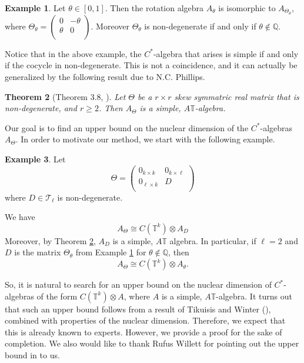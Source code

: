 \documentclass{amsart}
\newtheorem{theorem}{Theorem}[section]
\theoremstyle{definition}
\newtheorem{example}[theorem]{Example}
\newcommand{\Q}{\mathbb{Q}}
\newcommand{\TT}{\mathbb{T}}
\begin{document}
\begin{example}\label{rotation algebras skew symmetric matrix}
    Let $\theta\in [0,1]$. Then the rotation algebra $A_{\theta}$ is isomorphic to $A_{\Theta_{\theta}}$, where $\Theta_{\theta}=\begin{pmatrix}0&-\theta\\\theta&0\\ \end{pmatrix}$. Moreover $\Theta_{\theta}$ is non-degenerate if and only if $\theta \notin \Q$. 
\end{example}
Notice that in the above example, the $C^*$-algebra that arises is simple if and only if the cocycle in non-degenerate. This is not a coincidence, and it can actually be generalized by the following result due to N.C. Phillips.
\begin{theorem}[Theorem 3.8, \cite{simple_nc_torus}]\label{when nc torus is simple?}
 Let $\Theta$ be a $r\times r$ skew symmatric real matrix that is non-degenerate, and $r\geq 2$. Then $A_{\Theta}$ is a simple, $A\TT$-algebra.
\end{theorem}
Our goal is to find an upper bound on the nuclear dimension of the $C^*$-algebras $A_{\Theta}$. In order to motivate our method, we start with the following example.
\begin{example}\label{nc torus block digonal}
 Let $$\Theta=\begin{pmatrix}
     0_{k\times k}&0_{k\times \ell}\\ 0_{\ell \times k}& D\\
 \end{pmatrix}$$ where $D\in \mathcal{T}_{\ell}$ is non-degenerate. \par
We have
 $$A_{\Theta}\cong C(\TT^k)\otimes A_{D}$$
 Moreover, by Theorem \ref{when nc torus is simple?}, $A_D$ is a simple, $A\TT$ algebra.
 In particular, if $\ell=2$ and $D$ is the matrix $\Theta_{\theta}$ from Example \ref{rotation algebras skew symmetric matrix} for $\theta \notin \Q$, then
 $$A_{\Theta}\cong C(\TT^k)\otimes A_{\theta}.$$
\end{example}
So, it is natural to search for an upper bound on the nuclear dimension of $C^*$-algebras of the form $C(\TT^k)\otimes A$, where $A$ is a simple, $A\TT$-algebra. It turns out that such an upper bound follows from a result of Tikuisis and Winter (\cite{nuclear_dimension_commutative_tensor_Z}), combined with properties of the nuclear dimension. Therefore, we expect that this is already known to experts. However, we provide a proof for the sake of completion. We also would like to thank Rufus Willett for pointing out the upper bound in \cite{nuclear_dimension_commutative_tensor_Z} to us.
\end{document}
